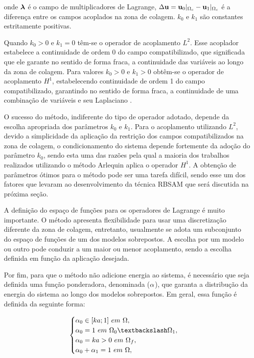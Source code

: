\documentclass[tese_patricia]{subfiles}
\begin{document}
\noindent onde $\boldsymbol{\lambda}$ é o campo de multiplicadores de Lagrange, $\Delta \mathbf{u} = \mathbf{u}_0 |_{\Omega_c} - \mathbf{u}_1 |_{\Omega_c}$ é a diferença entre os campos acoplados na zona de colagem. $k_{0}$ e $k_{1}$ são constantes estritamente positivas. 

Quando $k_{0} > 0$ e $k_{1} = 0 $ têm-se o operador de acoplamento $L^{2}$. Esse acoplador estabelece a continuidade de ordem 0 do campo compatibilizado, que significada que ele garante no sentido de forma fraca, a continuidade das variáveis ao longo da zona de colagem. Para valores $k_{0} > 0$ e $k_{1} > 0 $ obtêm-se o operador de acoplamento $H^{1}$, estabelecendo continuidade de ordem 1 do campo compatibilizado, garantindo no sentido de forma fraca, a continuidade de uma combinação de variáveis e seu Laplaciano \cite{GuidaultAndBelytschko2007}.

O sucesso do método, indiferente do tipo de operador adotado, depende da escolha apropriada dos parâmetros $k_{0}$ e $k_{1}$. Para o acoplamento utilizando $L^{2}$, devido a simplicidade da aplicação da restrição dos campos compatibilizados na zona de colagem, o condicionamento do sistema depende fortemente da adoção do parâmetro $k_{0}$, sendo esta uma das razões pela qual a maioria dos trabalhos realizados utilizando o método Arlequin aplica o operador $H^{1}$. A obtenção de parâmetros ótimos para o método pode ser uma tarefa difícil, sendo esse um dos fatores que levaram  ao desenvolvimento da técnica RBSAM que será discutida na próxima seção.

A definição do espaço de funções para os operadores de Lagrange é muito importante. O método apresenta flexibilidade para usar uma discretização diferente da zona de colagem, entretanto, usualmente se adota um subconjunto do espaço de funções de um dos modelos sobrepostos. A escolha por um modelo ou outro pode conduzir a um maior ou menor acoplamento, sendo a escolha definida em função da aplicação desejada. 

Por fim, para que o método não adicione energia ao sistema, é necessário que seja definida uma função ponderadora, denominada ($\alpha$), que garanta a distribução da energia do sistema ao longo dos modelos sobrepostos. Em geral, essa função é definida da seguinte forma:


\begin{align}
	\begin{cases} \arlequinWF_{0} \in [ka;1] \ em \ \Omega, \\ 
	\arlequinWF_{0} = 1 \ em \ \Omega_{0} \textbackslash \Omega_{1},  \\
	\arlequinWF_{0}  = ka > 0 \ em \ \Omega_{f}, \\
	\arlequinWFGlobal + \arlequinWFLocal = 1 \ em \ \Omega,
	\end{cases} \label{eq:alphai}
\end{align}
\end{document}
